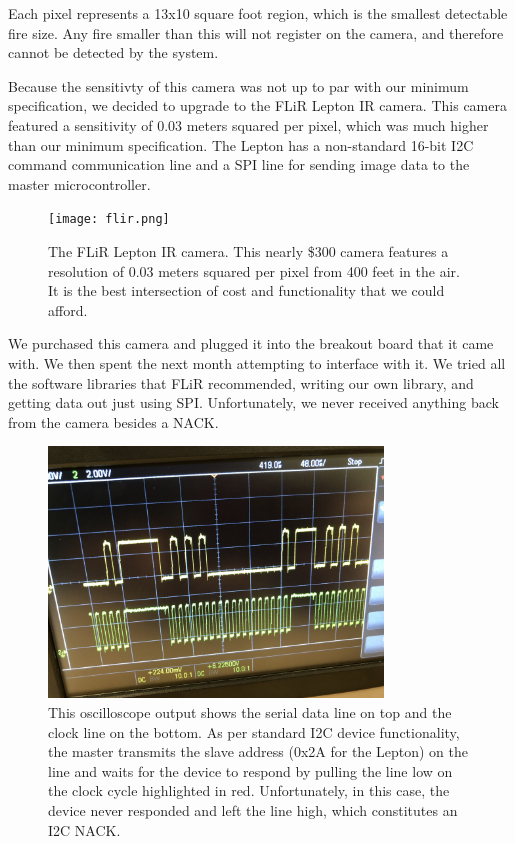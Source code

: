 \documentclass[12pt,journal,compsoc]{IEEEtran}
\begin{document}
Each pixel represents a 13x10 square foot region, which is the smallest detectable fire size. Any fire smaller than this 
will not register on the camera, and therefore cannot be detected by the system. 

Because the sensitivty of this camera was not up to par with our minimum specification, we decided to upgrade to the FLiR Lepton IR camera. This camera featured a sensitivity of 0.03 meters squared per pixel, which was much higher than our minimum specification. The Lepton has a non-standard 16-bit I2C command communication line and a SPI line for sending image data to the master microcontroller.

\begin{figure}[h]
\centering
\texttt{[image: flir.png]}
\caption{The FLiR Lepton IR camera. This nearly \$300 camera features a resolution of 0.03 meters squared per pixel from 400 feet in the air. It is the best intersection of cost and functionality that we could afford.}
\end{figure}

We purchased this camera and plugged it into the breakout board that it came with. We then spent the next month attempting to interface with it. We tried all the software libraries that FLiR recommended, writing our own library, and getting data out just using SPI. Unfortunately, we never received anything back from the camera besides a NACK. 

\begin{figure}[h]
\centering
\includegraphics[width=3.5in]{messed_up_flir.jpeg}
\caption{This oscilloscope output shows the serial data line on top and the clock line on the bottom. As per standard I2C device functionality, the master transmits the slave address (0x2A for the Lepton) on the line and waits for the device to respond by pulling the line low on the clock cycle highlighted in red. Unfortunately, in this case, the device never responded and left the line high, which constitutes an I2C NACK.}
\end{figure}	
\end{document}
